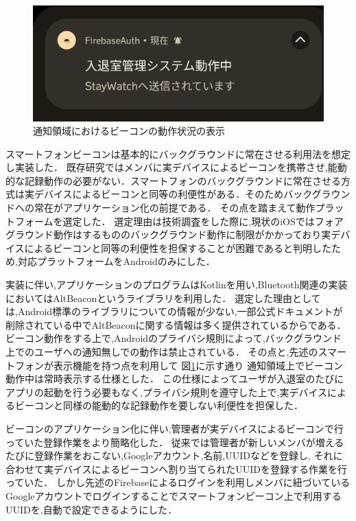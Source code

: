 \begin{figure}[tbh]
  \centering
  \includegraphics[width=12cm]{image/AppNofication.png}
  \caption{通知領域におけるビーコンの動作状況の表示}
  \label{fig:AppNofication}
\end{figure}


スマートフォンビーコンは基本的にバックグラウンドに常在させる利用法を想定し実装した．
既存研究ではメンバに実デバイスによるビーコンを携帯させ,能動的な記録動作の必要がない．スマートフォンのバックグラウンドに常在させる方式は実デバイスによるビーコンと同等の利便性がある．そのためバックグラウンドへの常在がアプリケーション化の前提である．
その点を踏まえて動作プラットフォームを選定した．
選定理由は技術調査をした際に,現状のiOSではフォアグラウンド動作はするもののバックグラウンド動作に制限がかかっており実デバイスによるビーコンと同等の利便性を担保することが困難であると判明したため,対応プラットフォームをAndroidのみにした．

実装に伴い,アプリケーションのプログラムはKotlinを用い,Bluetooth関連の実装においてはAltBeaconというライブラリを利用した．
選定した理由としては,Android標準のライブラリについての情報が少ない,一部公式ドキュメントが削除されている中でAltBeaconに関する情報は多く提供されているからである．
ビーコン動作をする上で,Androidのプライバシ規則によって,バックグラウンド上でのユーザへの通知無しでの動作は禁止されている．
その点と,先述のスマートフォンが表示機能を持つ点を利用して 図\ref{fig:AppNofication}に示す通り   通知領域上でビーコン動作中は常時表示する仕様とした．
この仕様によってユーザが入退室のたびにアプリの起動を行う必要もなく,プライバシ規則を遵守した上で,実デバイスによるビーコンと同様の能動的な記録動作を要しない利便性を担保した．

ビーコンのアプリケーション化に伴い,管理者が実デバイスによるビーコンで行っていた登録作業をより簡略化した．
従来では管理者が新しいメンバが増えるたびに登録作業をおこない,Googleアカウント,名前,UUIDなどを登録し,
それに合わせて実デバイスによるビーコンへ割り当てられたUUIDを登録する作業を行っていた．
しかし先述のFirebaseによるログインを利用しメンバに紐づいているGoogleアカウントでログインすることでスマートフォンビーコン上で利用するUUIDを,自動で設定できるようにした．

